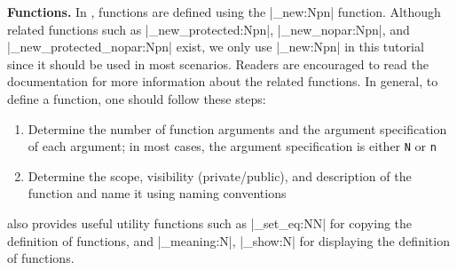 \documentclass{ltugboat}
\begin{document}
\noindent\textbf{Functions.}
In \LTT{}, functions are defined using the \inltex|\cs_new:Npn| function.
Although related functions such as \inltex|\cs_new_protected:Npn|, \inltex|\cs_new_nopar:Npn|, and \inltex|\cs_new_protected_nopar:Npn| exist, we only use \inltex|\cs_new:Npn| in this tutorial since it should be used in most scenarios. 
Readers are encouraged to read the \LTT{} documentation for more information about the related functions.
In general, to define a function, one should follow these steps:
\begin{enumerate}
    \item Determine the number of function arguments and the argument specification of each argument; in most cases, the argument specification is either \verb|N| or \verb|n|
    \item Determine the scope, visibility (private/public), and description of the function and name it using \LTT{} naming conventions
\end{enumerate}
\LTT{} also provides useful utility functions such as \inltex|\cs_set_eq:NN| for copying the definition of functions, and \inltex|\cs_meaning:N|, \inltex|\cs_show:N| for displaying the definition of functions.





\makesignature
\end{document}
